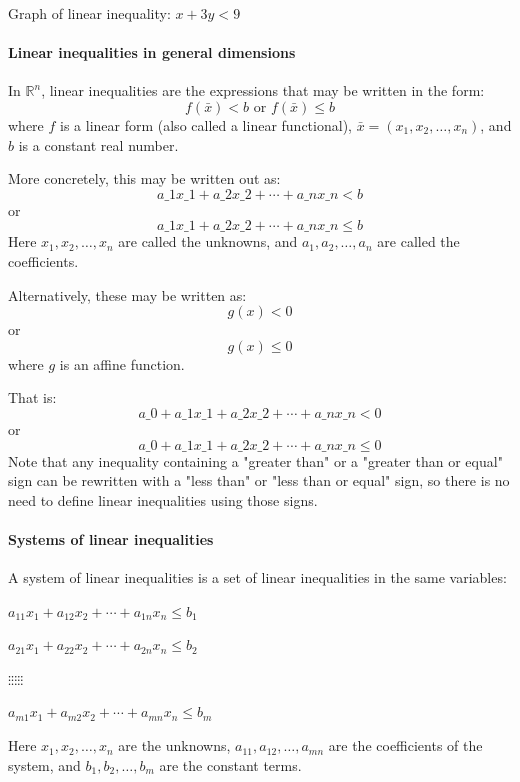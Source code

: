 Graph of linear inequality: $x + 3y < 9$


\paragraph{Linear inequalities in general dimensions}

In $\mathbb{R}^n$, linear inequalities are the expressions that may be written in the form:
$$
f(\bar{x}) < b \text{ or } f(\bar{x}) \leq b
$$
where $f$ is a linear form (also called a linear functional), $\bar{x} = (x_1, x_2, \ldots, x_n)$, and $b$ is a constant real number.

More concretely, this may be written out as:
$$
a\_1 x\_1 + a\_2 x\_2 + \cdots + a\_n x\_n < b
$$
or
$$
a\_1 x\_1 + a\_2 x\_2 + \cdots + a\_n x\_n \leq b
$$
Here $x_1, x_2, \ldots, x_n$ are called the unknowns, and $a_1, a_2, \ldots, a_n$ are called the coefficients.

Alternatively, these may be written as:
$$
g(x) < 0
$$
or
$$
g(x) \leq 0
$$
where $g$ is an affine function.

That is:
$$
a\_0 + a\_1 x\_1 + a\_2 x\_2 + \cdots + a\_n x\_n < 0
$$
or
$$
a\_0 + a\_1 x\_1 + a\_2 x\_2 + \cdots + a\_n x\_n \leq 0
$$
Note that any inequality containing a "greater than" or a "greater than or equal" sign can be rewritten with a "less than" or "less than or equal" sign, so there is no need to define linear inequalities using those signs.

\paragraph{Systems of linear inequalities}

A system of linear inequalities is a set of linear inequalities in the same variables:

$ a_{11} x_1 + a_{12} x_2  + \cdots + a_{1n} x_n \leq b_1 $

$ a_{21} x_1 + a_{22} x_2 + \cdots + a_{2n} x_n \leq b_2 $ 

$             \vdots                         \vdots                          \vdots                          \vdots                          \vdots $

$ a_{m1} x_1 + a_{m2} x_2 + \cdots + a_{mn} x_n \leq b_m $ 

Here $x_1, x_2, \ldots, x_n$ are the unknowns, $a_{11}, a_{12}, \ldots, a_{mn}$ are the coefficients of the system, and $b_1, b_2, \ldots, b_m$ are the constant terms.


